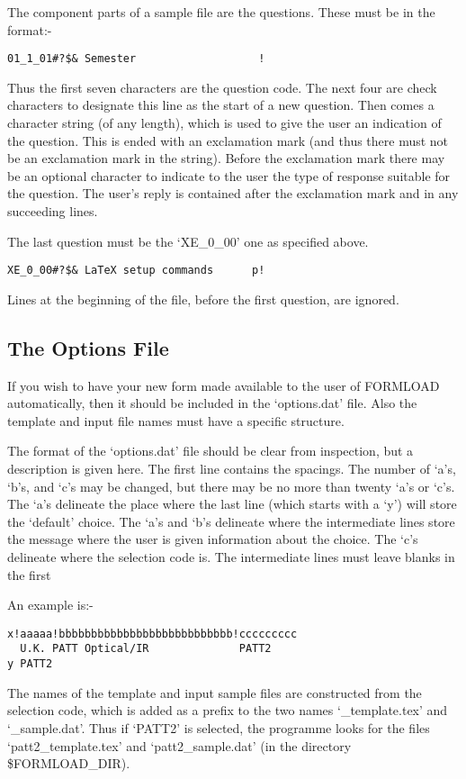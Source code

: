 The component parts of a sample file are the questions. These must be in
the format:- 

\begin{verbatim}
01_1_01#?$& Semester                   !
\end{verbatim}

Thus the first seven characters are the question code. The next four are
check characters to designate this line as the start of a new question.
Then comes a character string (of any length), which is used to give the
user an indication of the question. This is ended with an exclamation mark
(and thus there must not be an exclamation mark in the string). Before the
exclamation mark there may be an optional character to indicate to the user
the type of response suitable for the question. The user's reply is
contained after the exclamation mark and in any succeeding lines. 

The last question must be the `XE\_0\_00' one as specified above. 

\begin{verbatim}
XE_0_00#?$& LaTeX setup commands      p!
\end{verbatim}

Lines at the beginning of the file, before the first question, are ignored. 


\subsection{The Options File}

If you wish to have your new form made available to the user of FORMLOAD
automatically, then it should be included in the `options.dat' file. Also
the template and input file names must have a specific structure. 

The format of the `options.dat' file should be clear from inspection, but a
description is given here. The first line contains the spacings. The number
of `a's, `b's, and `c's may be changed, but there may be no more than
twenty `a's or `c's. The `a's delineate the place where the last line
(which starts with a `y') will store the `default' choice. The `a's and
`b's delineate where the intermediate lines store the message where the
user is given information about the choice. The `c's delineate where the
selection code is. The intermediate lines must leave blanks in the first 

An example is:-

\begin{verbatim}
x!aaaaa!bbbbbbbbbbbbbbbbbbbbbbbbbbb!ccccccccc
  U.K. PATT Optical/IR              PATT2
y PATT2
\end{verbatim}

The names of the template and input sample files are constructed from the
selection code, which is added as a prefix to the two names
`\_template.tex' and `\_sample.dat'. Thus if `PATT2' is selected, the
programme looks for the files `patt2\_template.tex' and `patt2\_sample.dat'
(in the directory \$FORMLOAD\_DIR). 



